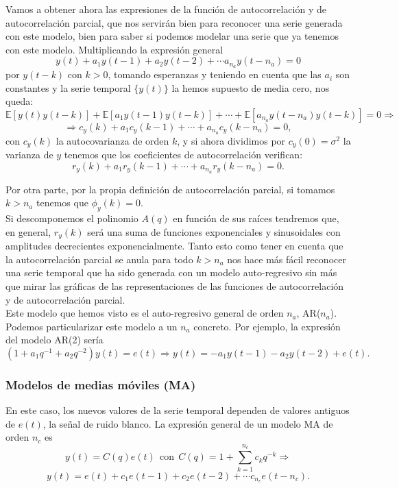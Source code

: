 Vamos a obtener ahora las expresiones de la función de autocorrelación y de autocorrelación parcial, que nos servirán bien para reconocer una serie generada con este modelo, bien para saber si podemos modelar una serie que ya tenemos con este modelo. Multiplicando la expresión general
\[	y(t) + a_1y(t-1) + a_2 y(t-2) + \cdots a_{n_a} y(t - n_a) = 0 \]
por $y(t-k)$ con $k>0$, tomando esperanzas y teniendo en cuenta que las $a_i$ son constantes y la serie temporal $\{y(t)\}$ la hemos supuesto de media cero, nos queda:
\[	\mathbb{E}[y(t)y(t-k)] + \mathbb{E}[a_1y(t-1)y(t-k)] + \cdots + \mathbb{E}[a_{n_a}y(t-n_a) y(t-k)] = 0 \Rightarrow	\]
\[	\Rightarrow c_y(k) + a_1 c_y(k-1) + \cdots + a_{n_a} c_y(k-n_a) = 0,	\]
con $c_y(k)$ la autocovarianza de orden $k$, y si ahora dividimos por $c_y(0) = \sigma^2$ la varianza de $y$ tenemos que los coeficientes de autocorrelación verifican:
\[	r_y(k) + a_1r_y(k-1) + \cdots + a_{n_a} r_y(k-n_a) = 0.	\]

Por otra parte, por la propia definición de autocorrelación parcial, si tomamos $k>n_a$ tenemos que $\phi_y(k) = 0$.\\

Si descomponemos el polinomio $A(q)$ en función de sus raíces tendremos que, en general, $r_y(k)$ será una suma de funciones exponenciales y sinusoidales con amplitudes decrecientes exponencialmente. Tanto esto como tener en cuenta que la autocorrelación parcial se anula para todo $k>n_a$ nos hace más fácil reconocer una serie temporal que ha sido generada con un modelo auto-regresivo sin más que mirar las gráficas de las representaciones de las funciones de autocorrelación y de autocorrelación parcial.\\

Este modelo que hemos visto es el auto-regresivo general de orden $n_a$, AR($n_a$). Podemos particularizar este modelo a un $n_a$ concreto. Por ejemplo, la expresión del modelo AR(2) sería
\[	(1+a_1q^{-1}+a_2q^{-2})y(t) = e(t) \Rightarrow y(t) = -a_1y(t-1)-a_2y(t-2) + e(t).	\]

\subsubsection{Modelos de medias móviles (MA)}

En este caso, los nuevos valores de la serie temporal dependen de valores antiguos de $e(t)$, la señal de ruido blanco. La expresión general de un modelo MA de orden $n_c$ es
\[ y(t) = C(q)e(t)\ \ \text{con}\ \ C(q) = 1 + \sum_{k=1}^{n_c} c_k q^{-k} \Rightarrow	\]
\begin{equation} \label{eq:MA}
y(t) = e(t) + c_1e(t-1) + c_2 e(t-2) + \cdots c_{n_c} e(t-n_c).
\end{equation}

